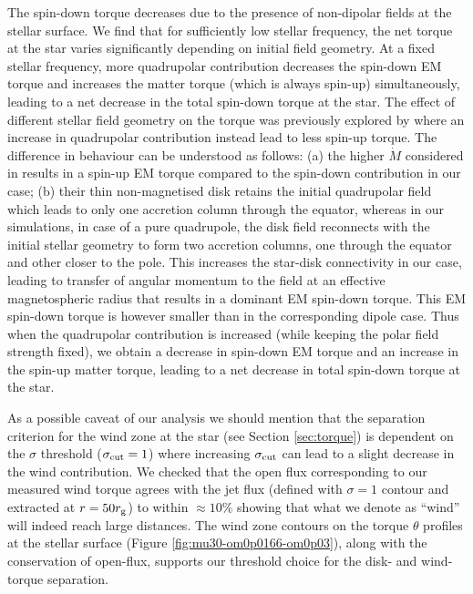 \documentclass[fleqn,usenatbib]{mnras}
\begin{document}
The spin-down torque decreases due to the presence of non-dipolar fields at the stellar surface. We find that for sufficiently low stellar frequency, the net torque at the star varies significantly depending on initial field geometry. At a fixed stellar frequency, more quadrupolar contribution decreases the spin-down EM torque and increases the matter torque (which is always spin-up) simultaneously, leading to a net decrease in the total spin-down torque at the star. 
The effect of different stellar field geometry on the torque was previously explored by \citet{Long2007,Long2008} where an increase in quadrupolar contribution instead lead to less spin-up torque. The difference in behaviour can be understood as follows: (a) the higher $\dot{M}$ considered in \cite{Long2007} results in a spin-up EM torque compared to the spin-down contribution in our case; (b) their thin non-magnetised disk retains the initial quadrupolar field which leads to only one accretion column through the equator, whereas in our simulations, in case of a pure quadrupole, the disk field reconnects with the initial stellar geometry to form two accretion columns, one through the equator and other closer to the pole. This increases the star-disk connectivity in our case, leading to transfer of angular momentum to the field at an effective magnetospheric radius that results in a dominant EM spin-down torque. This EM spin-down torque is however smaller than in the corresponding dipole case.  Thus when the quadrupolar contribution is increased (while keeping the polar field strength fixed), we obtain a decrease in spin-down EM torque and an increase in the spin-up matter torque, leading to a net decrease in total spin-down torque at the star.                       

As a possible caveat of our analysis we should mention that the separation criterion for the wind zone at the star (see Section \ref{sec:torque}) is dependent on the $\sigma$ threshold ($\sigma_{\rm cut} = 1$) where increasing $\sigma_{\rm cut}$ can lead to a slight decrease in the wind contribution. 
We checked that the open flux corresponding to our measured wind torque agrees with the jet flux (defined with $\sigma =1$ contour and extracted at $r=50 r_{\rm g}$) to within $\approx 10\%$ showing that what we denote as ``wind'' will indeed reach large distances. The wind zone contours on the torque $\theta$ profiles at the stellar surface (Figure \ref{fig:mu30-om0p0166-om0p03}), along with the conservation of open-flux, supports our threshold choice for the disk- and wind-torque separation.    
\end{document}

